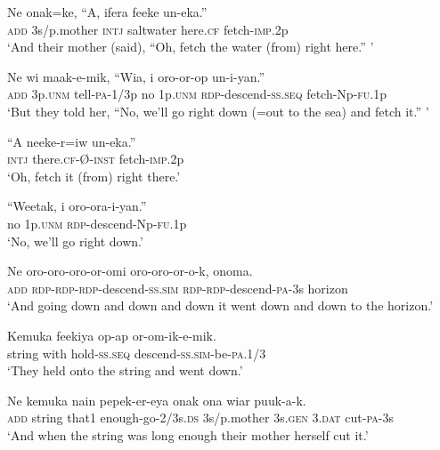 \ea
\gll  Ne  onak=ke,  “A,  ifera  feeke  un-eka.” \\
\textsc{add}  3s/p.mother  \textsc{intj}  saltwater  here.\textsc{cf}  fetch-\textsc{imp}.2p \\
\glt ‘And their mother (said), “Oh, fetch the water (from) right here.” ’ \\
\z


\ea
\gll  Ne  wi  maak-e-mik,  “Wia,  i  oro-or-op            un-i-yan.” \\
\textsc{add}  3p.\textsc{unm}  tell-\textsc{pa}-1/3p  no  1p.\textsc{unm}  \textsc{rdp}-descend-\textsc{ss.seq} fetch-Np-\textsc{fu}.1p \\


\glt ‘But they told her, “No, we’ll go right down (=out to the sea) and fetch it.” ’ \\
\z


\ea
\gll  “A  neeke-r=iw  un-eka.” \\
\textsc{intj}  there.\textsc{cf}-Ø-\textsc{inst}  fetch-\textsc{imp}.2p \\
\glt ‘Oh, fetch it (from) right there.’ \\
\z


\ea
\gll  “Weetak,  i  oro-ora-i-yan.” \\
no  1p.\textsc{unm}  \textsc{rdp}-descend-Np-\textsc{fu}.1p \\
\glt ‘No, we’ll go right down.’ \\
\z


\ea
\gll  Ne  oro-oro-oro-or-omi  oro-oro-or-o-k,  onoma. \\
\textsc{add}  \textsc{rdp}-\textsc{rdp}-\textsc{rdp}-descend-\textsc{ss}.\textsc{sim}  \textsc{rdp}-\textsc{rdp}-descend-\textsc{pa}-3s  horizon \\
\glt ‘And going down and down and down it went down and down to the horizon.’ \\
\z


\ea
\gll  Kemuka  feekiya  op-ap  or-om-ik-e-mik. \\
string  with  hold-\textsc{ss.seq}  descend-\textsc{ss}.\textsc{sim}-be-\textsc{pa}.1/3 \\
\glt ‘They held onto the string and went down.’ \\
\z


\ea
\gll  Ne  kemuka  nain  pepek-er-eya  onak  ona  wiar  puuk-a-k. \\
\textsc{add}  string  that1  enough-go-2/3s.\textsc{ds}  3s/p.mother  3s.\textsc{gen}  3.\textsc{dat}  cut-\textsc{pa}-3s \\
\glt ‘And when the string was long enough their mother herself cut it.’ \\
\z


